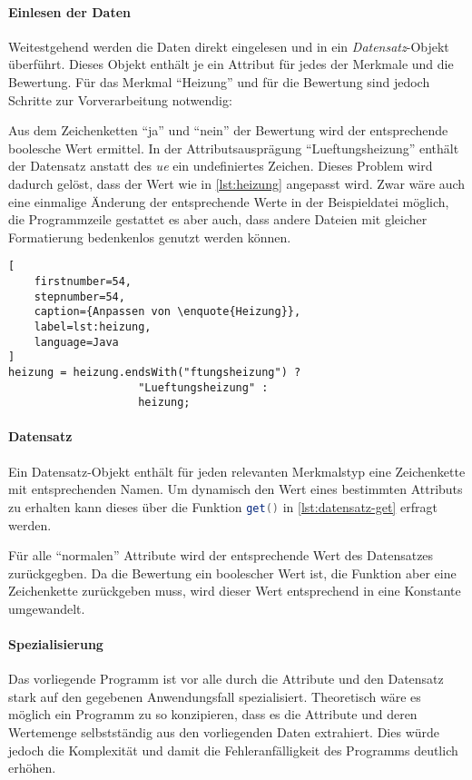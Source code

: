 \paragraph{Einlesen der Daten}
Weitestgehend werden die Daten direkt eingelesen und in ein \emph{Datensatz}-Objekt überführt.
Dieses Objekt enthält je ein Attribut für jedes der Merkmale und die Bewertung.
Für das Merkmal \enquote{Heizung} und für die Bewertung sind jedoch Schritte zur Vorverarbeitung notwendig:

Aus dem Zeichenketten \enquote{ja} und \enquote{nein} der Bewertung wird der entsprechende boolesche Wert ermittel.
In der Attributsausprägung \enquote{Lueftungsheizung} enthält der Datensatz anstatt des \textit{ue} ein undefiniertes Zeichen.
Dieses Problem wird dadurch gelöst, dass der Wert wie in \autoref{lst:heizung} angepasst wird.
Zwar wäre auch eine einmalige Änderung der entsprechende Werte in der Beispieldatei möglich,
die Programmzeile gestattet es aber auch, dass andere Dateien mit gleicher Formatierung bedenkenlos genutzt werden können.

\begin{lstlisting}[
    firstnumber=54,
    stepnumber=54,
    caption={Anpassen von \enquote{Heizung}},
    label=lst:heizung,
    language=Java
]
heizung = heizung.endsWith("ftungsheizung") ?
                    "Lueftungsheizung" :
                    heizung;
\end{lstlisting}

\paragraph{Datensatz}
Ein Datensatz-Objekt enthält für jeden relevanten Merkmalstyp eine Zeichenkette mit entsprechenden Namen.
Um dynamisch den Wert eines bestimmten Attributs zu erhalten kann dieses über die Funktion \lstinline[language=Java]{get()}
in \autoref{lst:datensatz-get} erfragt werden.



Für alle \enquote{normalen} Attribute wird der entsprechende Wert des Datensatzes zurückgegben.
Da die Bewertung ein boolescher Wert ist, die Funktion aber eine Zeichenkette zurückgeben muss,
wird dieser Wert entsprechend in eine Konstante umgewandelt.

\paragraph{Spezialisierung}
Das vorliegende Programm ist vor alle durch die Attribute und den Datensatz stark auf den gegebenen Anwendungsfall spezialisiert.
Theoretisch wäre es möglich ein Programm zu so konzipieren, dass es die Attribute und deren Wertemenge selbstständig aus den vorliegenden Daten extrahiert.
Dies würde jedoch die Komplexität und damit die Fehleranfälligkeit des Programms deutlich erhöhen.

